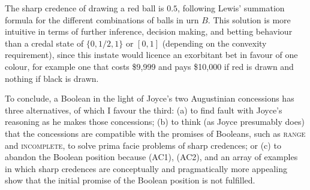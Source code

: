 \documentclass[11pt]{article}
\begin{document}
The sharp credence of drawing a red ball is $0.5$, following Lewis'
summation formula for the different combinations of balls in urn $B$.
This solution is more intuitive in terms of further inference,
decision making, and betting behaviour than a credal state of
$\{0,1/2,1\}$ or $[0,1]$ (depending on the convexity requirement),
since this instate would licence an exorbitant bet in favour of one
colour, for example one that costs \$9,999 and pays \$10,000 if red is
drawn and nothing if black is drawn.

To conclude, a Boolean in the light of Joyce's two Augustinian
concessions has three alternatives, of which I favour the third: (a)
to find fault with Joyce's reasoning as he makes those concessions;
(b) to think (as Joyce presumably does) that the concessions are
compatible with the promises of Booleans, such as \textsc{range} and
\textsc{incomplete}, to solve prima facie problems of sharp credences;
or (c) to abandon the Boolean position because (AC1), (AC2), and an
array of examples in which sharp credences are conceptually and
pragmatically more appealing show that the initial promise of the
Boolean position is not fulfilled.

 

\end{document}

